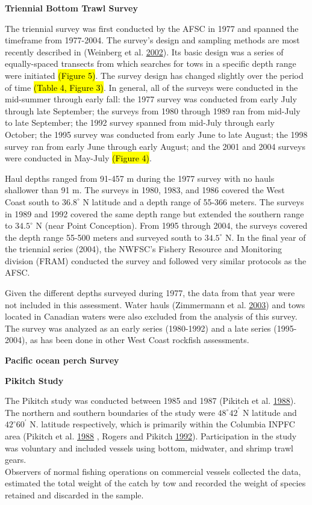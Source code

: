 \documentclass[12pt,]{article}
\begin{document}
\textbf{Triennial Bottom Trawl Survey}

The triennial survey was first conducted by the AFSC in 1977 and spanned
the timeframe from 1977-2004. The survey's design and sampling methods
are most recently described in (Weinberg et al.
\protect\hyperlink{ref-weinberg_estimation_2002}{2002}). Its basic
design was a series of equally-spaced transects from which searches for
tows in a specific depth range were initiated \hl{(Figure 5)}. The
survey design has changed slightly over the period of time
\hl{(Table 4, Figure 3)}. In general, all of the surveys were conducted
in the mid-summer through early fall: the 1977 survey was conducted from
early July through late September; the surveys from 1980 through 1989
ran from mid-July to late September; the 1992 survey spanned from
mid-July through early October; the 1995 survey was conducted from early
June to late August; the 1998 survey ran from early June through early
August; and the 2001 and 2004 surveys were conducted in May-July
\hl{(Figure 4)}.

Haul depths ranged from 91-457 m during the 1977 survey with no hauls
shallower than 91 m. The surveys in 1980, 1983, and 1986 covered the
West Coast south to \(36.8^\circ\) N latitude and a depth range of
55-366 meters. The surveys in 1989 and 1992 covered the same depth range
but extended the southern range to \(34.5^\circ\) N (near Point
Conception). From 1995 through 2004, the surveys covered the depth range
55-500 meters and surveyed south to \(34.5^\circ\) N. In the final year
of the triennial series (2004), the NWFSC's Fishery Resource and
Monitoring division (FRAM) conducted the survey and followed very
similar protocols as the AFSC.

Given the different depths surveyed during 1977, the data from that year
were not included in this assessment. Water hauls (Zimmermann et al.
\protect\hyperlink{ref-zimmermann_influence_2003}{2003}) and tows
located in Canadian waters were also excluded from the analysis of this
survey. The survey was analyzed as an early series (1980-1992) and a
late series (1995-2004), as has been done in other West Coast rockfish
assessments.

\textbf{Pacific ocean perch Survey}

\textbf{Pikitch Study}

The Pikitch study was conducted between 1985 and 1987 (Pikitch et al.
\protect\hyperlink{ref-pikitch_evaluation_1988}{1988}). The northern and
southern boundaries of the study were \(48^\circ 42^\prime\) N latitude
and \(42^\circ 60^\prime\) N. latitude respectively, which is primarily
within the Columbia INPFC area (Pikitch et al.
\protect\hyperlink{ref-pikitch_evaluation_1988}{1988} , Rogers and
Pikitch \protect\hyperlink{ref-rogers_numerical_1992}{1992}).
Participation in the study was voluntary and included vessels using
bottom, midwater, and shrimp trawl gears.\\
Observers of normal fishing operations on commercial vessels collected
the data, estimated the total weight of the catch by tow and recorded
the weight of species retained and discarded in the sample.
\end{document}
